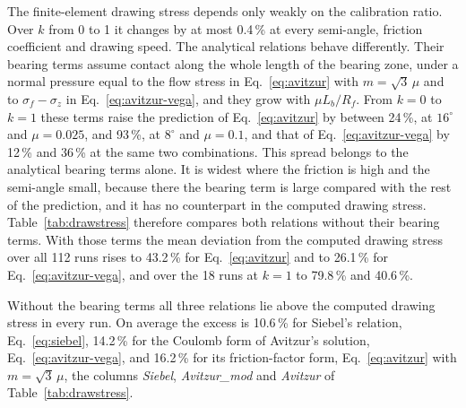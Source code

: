 \documentclass[subscriptcorrection,upint,varvw,barcolor=Goldenrod3,mathalfa=cal=euler,balance,hyphenate,french,pdf-a]{asmejour} %
\begin{document}
The finite-element drawing stress depends only weakly on the calibration ratio. Over $k$ from 0 to
1 it changes by at most 0.4\,\% at every semi-angle, friction coefficient and drawing speed. The
analytical relations behave differently. Their bearing terms assume contact along the whole length
of the bearing zone, under a normal pressure equal to the flow stress in Eq.~\eqref{eq:avitzur}
with $m=\sqrt3\,\mu$ and to $\sigma_f-\sigma_z$ in Eq.~\eqref{eq:avitzur-vega}, and they grow with
$\mu L_b/R_f$. From $k=0$ to $k=1$ these terms raise the prediction of Eq.~\eqref{eq:avitzur} by
between 24\,\%, at $16^\circ$ and $\mu=0.025$, and 93\,\%, at $8^\circ$ and $\mu=0.1$, and that of
Eq.~\eqref{eq:avitzur-vega} by 12\,\% and 36\,\% at the same two combinations. This spread belongs
to the analytical bearing terms alone. It is widest where the friction is high and the semi-angle
small, because there the bearing term is large compared with the rest of the prediction, and it
has no counterpart in the computed drawing stress. Table~\ref{tab:drawstress} therefore compares
both relations without their bearing terms. With those terms the mean deviation from the computed
drawing stress over all 112 runs rises to 43.2\,\% for Eq.~\eqref{eq:avitzur} and to 26.1\,\% for
Eq.~\eqref{eq:avitzur-vega}, and over the 18 runs at $k=1$ to 79.8\,\% and 40.6\,\%.

Without the bearing terms all three relations lie above the computed drawing stress in every run.
On average the excess is 10.6\,\% for Siebel's relation, Eq.~\eqref{eq:siebel}, 14.2\,\% for the
Coulomb form of Avitzur's solution, Eq.~\eqref{eq:avitzur-vega}, and 16.2\,\% for its
friction-factor form, Eq.~\eqref{eq:avitzur} with $m=\sqrt3\,\mu$, the columns \emph{Siebel},
\emph{Avitzur\_mod} and \emph{Avitzur} of Table~\ref{tab:drawstress}.
\end{document}
